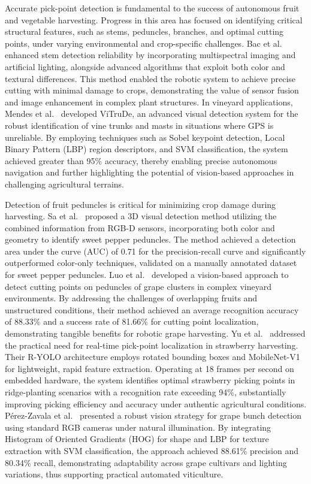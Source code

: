 \documentclass[a4paper,fleqn]{cas-dc}
\begin{document}
Accurate pick-point detection is fundamental to the success of autonomous fruit and vegetable harvesting. Progress in this area has focused on identifying critical structural features, such as stems, peduncles, branches, and optimal cutting points, under varying environmental and crop-specific challenges.
Bac et al.~\cite{bac2017performance} enhanced stem detection reliability by incorporating multispectral imaging and artificial lighting, alongside advanced algorithms that exploit both color and textural differences. This method enabled the robotic system to achieve precise cutting with minimal damage to crops, demonstrating the value of sensor fusion and image enhancement in complex plant structures.
In vineyard applications, Mendes et al.~\cite{mendes2016vine} developed ViTruDe, an advanced visual detection system for the robust identification of vine trunks and masts in situations where GPS is unreliable. By employing techniques such as Sobel keypoint detection, Local Binary Pattern (LBP) region descriptors, and SVM classification, the system achieved greater than 95\% accuracy, thereby enabling precise autonomous navigation and further highlighting the potential of vision-based approaches in challenging agricultural terrains.

Detection of fruit peduncles is critical for minimizing crop damage during harvesting. Sa et al.~\cite{sa2017peduncle} proposed a 3D visual detection method utilizing the combined information from RGB-D sensors, incorporating both color and geometry to identify sweet pepper peduncles. The method achieved a detection area under the curve (AUC) of 0.71 for the precision-recall curve and significantly outperformed color-only techniques, validated on a manually annotated dataset for sweet pepper peduncles.
Luo et al.~\cite{luo2018vision} developed a vision-based approach to detect cutting points on peduncles of grape clusters in complex vineyard environments. By addressing the challenges of overlapping fruits and unstructured conditions, their method achieved an average recognition accuracy of 88.33\% and a success rate of 81.66\% for cutting point localization, demonstrating tangible benefits for robotic grape harvesting.
Yu et al.~\cite{yu2020real} addressed the practical need for real-time pick-point localization in strawberry harvesting. Their R-YOLO architecture employs rotated bounding boxes and MobileNet-V1 for lightweight, rapid feature extraction. Operating at 18 frames per second on embedded hardware, the system identifies optimal strawberry picking points in ridge-planting scenarios with a recognition rate exceeding 94\%, substantially improving picking efficiency and accuracy under authentic agricultural conditions.
Pérez-Zavala et al.~\cite{perez2018pattern} presented a robust vision strategy for grape bunch detection using standard RGB cameras under natural illumination. By integrating Histogram of Oriented Gradients (HOG) for shape and LBP for texture extraction with SVM classification, the approach achieved 88.61\% precision and 80.34\% recall, demonstrating adaptability across grape cultivars and lighting variations, thus supporting practical automated viticulture.
\end{document}
